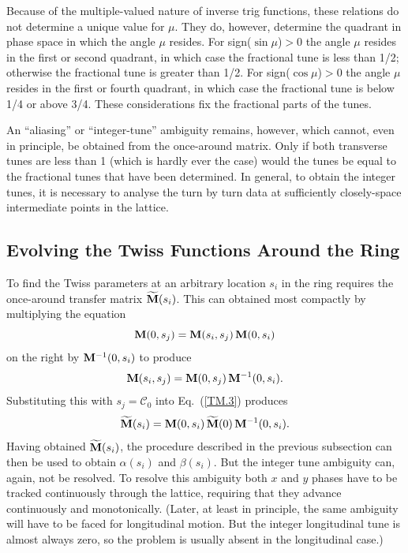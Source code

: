 \documentclass[]{article}
\begin{document}
Because of the multiple-valued nature of inverse trig functions,
these relations do not determine a unique value for $\mu$. They do,
however, determine the quadrant in phase space in which the angle $\mu$
resides. For sign($\sin\mu$)$>$0 the angle $\mu$ resides in the first
or second quadrant, in which case the fractional tune is less than 1/2;
otherwise the fractional tune is greater than 1/2.
For sign($\cos\mu$)$>$0 the angle $\mu$ resides in the first
or fourth quadrant, in which case the fractional tune is below 1/4
or above 3/4. These considerations fix the fractional parts of
the tunes.

An ``aliasing'' or ``integer-tune'' ambiguity remains, however,
which cannot, even in principle, be obtained from the once-around 
matrix. Only if both transverse tunes are less than 1 (which is 
hardly ever the
case) would the tunes be equal to the fractional tunes that have
been determined. In general, to obtain the integer tunes, it is 
necessary to analyse the turn by turn data at sufficiently closely-space 
intermediate points in the lattice.

\subsection{Evolving the Twiss Functions Around the Ring}
To find the Twiss parameters at an arbitrary location $s_i$ in the
ring requires the once-around transfer matrix ${\widetilde{\bf M}}(s_i)$. 
This can obtained most compactly by multiplying the equation
%
\begin{equation}
{\bf M}(0,s_j)
 =
{\bf M}(s_i,s_j)\,{\bf M}(0,s_i)
\label{TM.9}
\end{equation}
%
on the right by ${\bf M}^{-1}(0,s_i)$ to produce
%
\begin{equation}
{\bf M}(s_i,s_j)
 =
{\bf M}(0,s_j)\,{\bf M}^{-1}(0,s_i).
\label{TM.10}
\end{equation}
%
Substituting this with $s_j=\mathcal{C}_0$ into Eq.~(\ref{TM.3}) 
produces
%
\begin{equation}
\widetilde{\bf M}(s_i)
 =
{\bf M}(0,s_i)\,\widetilde{\bf M}(0)\,{\bf M}^{-1}(0,s_i).
\label{TM.11}
\end{equation}
%
Having obtained ${\widetilde{\bf M}}(s_i)$,
the procedure described in the previous subsection can
then be used to obtain $\alpha(s_i)$ and $\beta(s_i)$.
But the integer tune ambiguity can, again, not be
resolved. To resolve this ambiguity both $x$ and $y$ phases
have to be tracked continuously through the lattice,
requiring that they advance continuously and monotonically.
(Later, at least in principle, the same ambiguity will 
have to be faced for longitudinal motion. But the
integer longitudinal tune is almost always zero, so the
problem is usually absent in the longitudinal case.)
\end{document}
